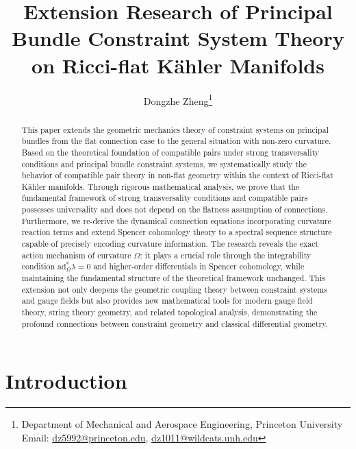 \documentclass[a4paper,12pt]{extarticle}
\theoremstyle{definition}
\begin{document}
\pagestyle{plain}

\title{Extension Research of Principal Bundle Constraint System Theory on Ricci-flat Kähler Manifolds}
\author{Dongzhe Zheng\thanks{Department of Mechanical and Aerospace Engineering, Princeton University\\ Email: \href{mailto:dz5992@princeton.edu}{dz5992@princeton.edu}, \href{mailto:dz1011@wildcats.unh.edu}{dz1011@wildcats.unh.edu}}}
\date{}
\maketitle

\begin{abstract}
This paper extends the geometric mechanics theory of constraint systems on principal bundles from the flat connection case to the general situation with non-zero curvature. Based on the theoretical foundation of compatible pairs under strong transversality conditions and principal bundle constraint systems, we systematically study the behavior of compatible pair theory in non-flat geometry within the context of Ricci-flat Kähler manifolds. Through rigorous mathematical analysis, we prove that the fundamental framework of strong transversality conditions and compatible pairs possesses universality and does not depend on the flatness assumption of connections. Furthermore, we re-derive the dynamical connection equations incorporating curvature reaction terms and extend Spencer cohomology theory to a spectral sequence structure capable of precisely encoding curvature information. The research reveals the exact action mechanism of curvature $\Omega$: it plays a crucial role through the integrability condition $\text{ad}_\Omega^* \lambda = 0$ and higher-order differentials in Spencer cohomology, while maintaining the fundamental structure of the theoretical framework unchanged. This extension not only deepens the geometric coupling theory between constraint systems and gauge fields but also provides new mathematical tools for modern gauge field theory, string theory geometry, and related topological analysis, demonstrating the profound connections between constraint geometry and classical differential geometry.
\end{abstract}

\section{Introduction}
\end{document}
